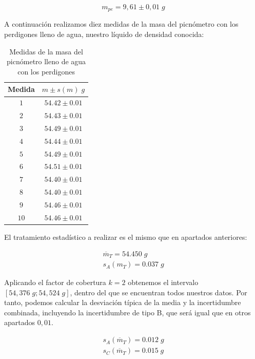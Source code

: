 \documentclass[a4paper,12pt,titlepage]{report}
\begin{document}
\begin{equation}
    m_{pe} = 9,61 \pm 0,01 \; g
\end{equation}

A continuación realizamos diez medidas de la masa del picnómetro con los perdigones lleno de agua, nuestro líquido de densidad conocida:

\newpage

\begin{table}[h!]
    \centering
    \begin{tabular}{|c|c|}
    \hline
    Medida & $m \pm s(m) \; g$ \\ \hline
    $1$    & $54.42\pm0.01$ \\ \hline
    $2$    & $54.43\pm0.01$ \\ \hline
    $3$    & $54.49\pm0.01$ \\ \hline
    $4$    & $54.44\pm0.01$ \\ \hline
    $5$    & $54.49\pm0.01$ \\ \hline
    $6$    & $54.51\pm0.01$ \\ \hline
    $7$    & $54.40\pm0.01$ \\ \hline
    $8$    & $54.40\pm0.01$ \\ \hline
    $9$    & $54.46\pm0.01$ \\ \hline
    $10$   & $54.46\pm0.01$ \\ \hline
    \end{tabular}
    \caption{Medidas de la masa del picnómetro lleno de agua con los perdigones}
    \label{Masas Perdigones}
    \end{table}

El tratamiento estadístico a realizar es el mismo que en apartados anteriores:

\begin{gather}
    \overline{m}_{T} = 54.450 \; g \\
    s_{A}(m_{T}) = 0.037 \; g
\end{gather}

Aplicando el factor de cobertura $k=2$ obtenemos el intervalo $[54,376 \; g  ; 54,524 \; g]$, dentro del que se encuentran todos nuestros datos. Por tanto, podemos calcular la desviación típica de la media y la incertidumbre combinada, incluyendo la incertidumbre de tipo B, que será igual que en otros apartados $0,01$.

\begin{gather}
    s_{A}(\overline{m}_{T}) = 0.012 \; g \\
    s_{C}(\overline{m}_{T}) = 0.015 \; g
\end{gather}
\end{document}
